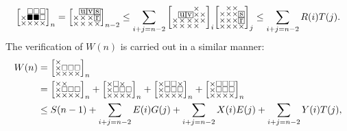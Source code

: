\documentclass[a4paper,12pt]{article}
\makeatletter
\newcommand{\mybox}[1]{%
  \begingroup
  \setlength{\fboxsep}{1pt}%
  \fbox{\small #1}%
  \endgroup
}
\newenvironment{grid}
  {\begingroup\footnotesize
   \renewcommand{\arraystretch}{0}
   \setlength{\arraycolsep}{0pt}
   \left[\begin{array}{@{}*{10}{c}@{}}}
  {\end{array}\right]\endgroup}
\newcommand{\void}{\phantom{\times}}
\newcommand{\myW}{
    \begin{grid}
        \times & \void & \void & \void \\
        \times & \square & \square & \square \\
        \times & \times & \times & \times
    \end{grid}
}
\makeatother
\begin{document}
	\[
		 \begin{grid}
			\void & \square & \square & \square \\
			\times & \blacksquare & \blacksquare & \square \\
			\times & \times & \times & \times
		    \end{grid}_n = \begin{grid}
			\void & \mybox{u} & \mybox{v} & \mybox{s} \\
			\times & \times & \times & \mybox{r} \\
			\times & \times & \times & \times
		 \end{grid}_{n-2} \le \sum_{i+j=n-2} \begin{grid}
			 \void & \void & \void & \times & \void\\
			 \void & \mybox{u} & \mybox{v} & \times & \times \\
			 \times & \times & \times & \times & \times \\
			 \times & \times & \times & \times & \void
		 \end{grid}_i \begin{grid}
			\void & \times & \times & \void \\
			\times & \times & \times & \mybox{s} \\
			\times & \times & \times & \mybox{r} \\
			\times & \times & \times & \times
		 \end{grid}_j \le \sum_{i+j=n-2} R(i)T(j).
	\]
	The verification of $W(n)$ is carried out in a similar manner:
	\begin{align*}
		W(n) &= \myW_n \\
		&=\begin{grid}
        \times & \times & \void & \void \\
        \times & \square & \square & \square \\
        \times & \times & \times & \times
    \end{grid}_n + \begin{grid}
        \times & \square & \times & \void \\
        \times & \square & \square & \square \\
        \times & \times & \times & \times
    \end{grid}_n + \begin{grid}
        \times & \square & \square & \times \\
        \times & \square & \square & \square \\
        \times & \times & \times & \times
    \end{grid}_n + \begin{grid}
        \times & \square & \square & \square \\
        \times & \square & \square & \square \\
        \times & \times & \times & \times
    \end{grid}_n \\
		&\le S(n-1)
		      + \sum_{i+j=n-2} E(i)G(j)
		      + \sum_{i+j=n-2} X(i)E(j)
		      + \sum_{i+j=n-2} Y(i)T(j),
	\end{align*}
\end{document}
